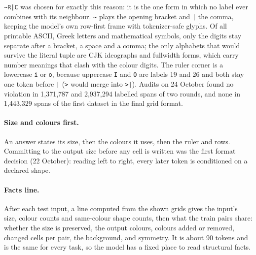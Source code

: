 \documentclass[11pt]{article}
\begin{document}
\noindent \texttt{\textasciitilde R|C} was chosen for exactly this reason: it is the
one form in which no label ever combines with its neighbour. \texttt{\textasciitilde}
plays the opening bracket and \texttt{|} the comma, keeping the model's own
row-first frame with tokenizer-safe glyphs. Of all printable
ASCII, Greek letters and mathematical symbols, only the digits stay separate
after a bracket, a space and a comma; the only alphabets that would survive the
literal tuple are CJK ideographs and fullwidth forms, which carry number
meanings that clash with the colour digits. The ruler corner is a lowercase
\texttt{i} or \texttt{o}, because uppercase \texttt{I} and \texttt{O} are labels
19 and 26 and both stay one token before \texttt{|} (\texttt{>} would merge into
\texttt{>|}). Audits on 24 October found no violation in 1,371,787 and
2,937,294 labelled spans of two rounds, and none in 1,443,329 spans of the first
dataset in the final grid format.

\paragraph{Size and colours first.} An answer states its size, then the colours
it uses, then the ruler and rows. Committing to the output size before any cell
is written was the first format decision (22 October): reading left to right,
every later token is conditioned on a declared shape.

\paragraph{Facts line.} After each test input, a line computed from the shown
grids gives the input's size, colour counts and same-colour shape counts, then
what the train pairs share: whether the size is preserved, the output colours,
colours added or removed, changed cells per pair, the background, and symmetry.
It is about 90 tokens and is the same for every task, so the model has a fixed
place to read structural facts.
\end{document}
